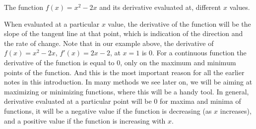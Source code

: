 \begin{marginfigure}
  \caption{The function $f(x) = x^{2} - 2x$ and its derivative evaluated at,
    different $x$ values.
  }
\end{marginfigure}
When evaluated at a particular $x$ value,
the derivative of the function will be
the slope of the tangent line at that point,
which is indication of the direction and the rate of change.
Note that in our example above,
the derivative of $f(x) = x^{2} - 2x$, $f'(x) = 2 x - 2$,  at $x = 1$ is $0$.
For a continuous function the derivative of the function is equal to $0$,
only on the maximum and minimum points of the function.
And this is the most important reason for all the earlier
notes in this introduction.
In many methods we see later on,
we will be aiming at maximizing or minimizing functions,
where this will be a handy tool.
In general,
derivative evaluated at a particular point will be $0$ for maxima and minima
of functions,
it will be a negative value if the function is decreasing (as $x$ increases),
and a positive value if the function is increasing with $x$.

